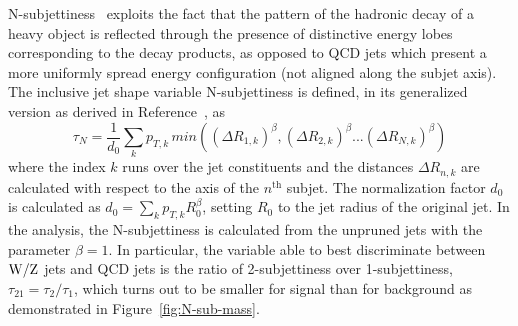 N-subjettiness~\cite{Thaler:2010tr,Thaler:2011gf,Stewart:2010tn} exploits the fact that the pattern of the hadronic decay of a heavy object is reflected through the presence of distinctive energy lobes corresponding to the decay products, as opposed to QCD jets which present a more uniformly spread energy configuration (not aligned along the subjet axis). The inclusive jet shape variable N-subjettiness is defined, in its generalized version as derived in Reference~\cite{Thaler:2010tr}, as 
%
\begin{equation}
\tau_N = \frac{1}{d_{0}} \sum_{k} p_{T,k}\,min( (\Delta R_{1,k})^{\beta}, (\Delta R_{2,k})^{\beta}...(\Delta R_{N,k})^{\beta})
\end{equation}
%
where the index $k$ runs over the jet constituents and the distances
$\Delta R_{n,k}$ are calculated with respect to the axis of the $n^{\mathrm{th}}$
subjet. The normalization factor $d_{0}$ is calculated as $d_{0}=
\sum_{k} p_{T,k}R^{\beta}_{0}$, setting $R_{0}$ to the jet radius of
the original jet. In the analysis, the N-subjettiness is calculated
from the unpruned jets with the parameter $\beta=1$. In particular,
the variable able to best discriminate between ${\rm W}/{\rm Z}$ jets and QCD jets
is the ratio of 2-subjettiness over 1-subjettiness,
$\tau_{21}=\tau_{2} / \tau_{1}$, which turns out to be smaller for signal than for background as demonstrated in Figure~\ref{fig:N-sub-mass}.

